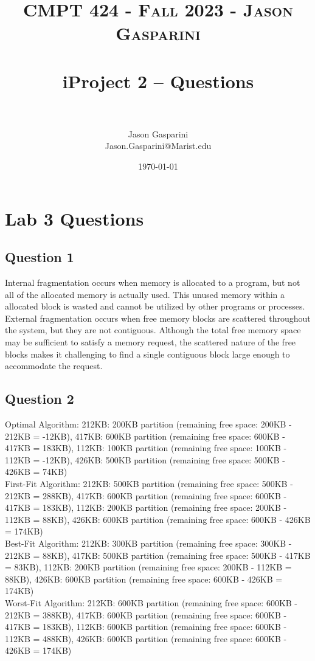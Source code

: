 \documentclass[letterpaper, 10pt]{article}
\title{	
   \normalfont \normalsize 
   \textsc{CMPT 424 - Fall 2023 - Jason Gasparini} \\[10pt] %
   \horrule{0.5pt} \\[0.25cm] 	%
   \huge iProject 2 -- Questions \\     	    %
   \horrule{0.5pt} \\[0.25cm] 	%
}
\author{Jason Gasparini \\ \normalsize Jason.Gasparini@Marist.edu}
\date{\normalsize\today} 	%
\begin{document}
\maketitle %



\section{Lab 3 Questions}
\subsection{Question 1}
Internal fragmentation occurs when memory is allocated to a program, but not all of the allocated memory is actually used. This unused memory within a allocated block is wasted and cannot be utilized by other programs or processes. External fragmentation occurs when free memory blocks are scattered throughout the system, but they are not contiguous. Although the total free memory space may be sufficient to satisfy a memory request, the scattered nature of the free blocks makes it challenging to find a single contiguous block large enough to accommodate the request.

\subsection{Question 2}
Optimal Algorithm:
212KB: 200KB partition (remaining free space: 200KB - 212KB = -12KB), 417KB: 600KB partition (remaining free space: 600KB - 417KB = 183KB), 112KB: 100KB partition (remaining free space: 100KB - 112KB = -12KB), 426KB: 500KB partition (remaining free space: 500KB - 426KB = 74KB)
\\
First-Fit Algorithm:
212KB: 500KB partition (remaining free space: 500KB - 212KB = 288KB), 417KB: 600KB partition (remaining free space: 600KB - 417KB = 183KB), 112KB: 200KB partition (remaining free space: 200KB - 112KB = 88KB), 426KB: 600KB partition (remaining free space: 600KB - 426KB = 174KB)
\\
Best-Fit Algorithm:
212KB: 300KB partition (remaining free space: 300KB - 212KB = 88KB), 417KB: 500KB partition (remaining free space: 500KB - 417KB = 83KB), 112KB: 200KB partition (remaining free space: 200KB - 112KB = 88KB), 426KB: 600KB partition (remaining free space: 600KB - 426KB = 174KB)
\\
Worst-Fit Algorithm:
212KB: 600KB partition (remaining free space: 600KB - 212KB = 388KB), 417KB: 600KB partition (remaining free space: 600KB - 417KB = 183KB), 112KB: 600KB partition (remaining free space: 600KB - 112KB = 488KB), 426KB: 600KB partition (remaining free space: 600KB - 426KB = 174KB)
\end{document}
